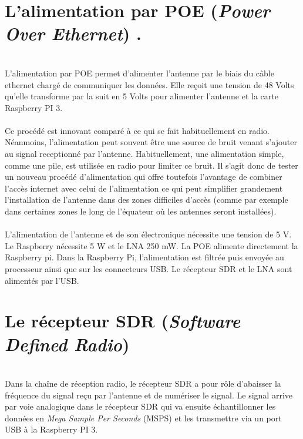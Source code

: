 \documentclass[12pt,fleqn]{book} %
\begin{document}
\section{L'alimentation par POE (\emph{Power Over Ethernet}) .}
~\\\indent L'alimentation par POE permet d'alimenter l'antenne par le biais du câble ethernet chargé de communiquer les données. Elle reçoit une tension de 48 Volts qu'elle transforme par la suit en 5 Volts pour alimenter l'antenne et la carte Raspberry PI 3.
~\\\\Ce procédé est innovant comparé à ce qui se fait habituellement en radio. Néanmoins, l'alimentation peut souvent être une source de bruit venant s'ajouter au signal receptionné par l'antenne. Habituellement, une alimentation simple, comme une pile, est utilisée en radio pour limiter ce bruit. Il s'agit donc de tester un nouveau procédé d'alimentation qui offre toutefois l'avantage de combiner l'accès internet avec celui de l'alimentation ce qui peut simplifier grandement l'installation  
de l'antenne dans des zones difficiles d'accès (comme par exemple dans certaines zones le long de l'équateur où les antennes seront installées).
~\\\\L’alimentation de l’antenne et de son électronique nécessite une tension de 5 V. Le Raspberry nécessite 5 W et le LNA 250 mW. La POE alimente directement la Raspberry pi. Dans la Raspberry Pi, l’alimentation est filtrée puis envoyée au processeur ainsi que sur les connecteurs USB. Le récepteur SDR et le LNA sont alimentés par l’USB.
\section{Le récepteur SDR (\emph{Software Defined Radio})}
~\\\indent Dans la chaîne de réception radio, le récepteur SDR a pour rôle d'abaisser la fréquence du signal reçu par l'antenne et de numériser le signal. Le signal arrive par voie analogique dans le récepteur SDR qui va ensuite échantillonner les données en \emph{Mega Sample Per Seconds} (MSPS) et les transmettre via un port USB à la Raspberry PI 3.
\end{document}
